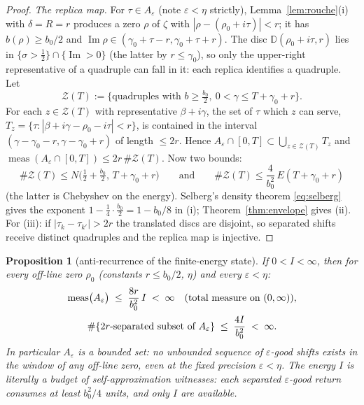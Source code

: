 \documentclass[11pt]{amsart}
\theoremstyle{plain}
\newtheorem{proposition}[theorem]{Proposition}
\theoremstyle{definition}
\theoremstyle{remark}
\newcommand{\meas}{\operatorname{meas}}
\newcommand{\Imm}{\operatorname{Im}}
\begin{document}
\begin{proof}
\emph{The replica map.} For $\tau\in A_\varepsilon$ (note $\varepsilon<\eta$ strictly), Lemma~\ref{lem:rouche}(i) with $\delta=R=r$ produces a zero $\rho$ of $\zeta$ with $|\rho-(\rho_0+i\tau)|<r$; it has $b(\rho)\ge b_0/2$ and $\Imm\rho\in(\gamma_0+\tau-r,\gamma_0+\tau+r)$. The disc $\mathbb D(\rho_0+i\tau,r)$ lies in $\{\sigma>\tfrac12\}\cap\{\Imm>0\}$ (the latter by $r\le\gamma_0$), so only the upper-right representative of a quadruple can fall in it: each replica identifies a quadruple. Let
\[
\mathcal Z(T):=\bigl\{\text{quadruples with } b\ge\tfrac{b_0}2,\ 0<\gamma\le T+\gamma_0+r\bigr\}.
\]
For each $z\in\mathcal Z(T)$ with representative $\beta+i\gamma$, the set of $\tau$ which $z$ can serve, $T_z=\{\tau:|\beta+i\gamma-\rho_0-i\tau|<r\}$, is contained in the interval $(\gamma-\gamma_0-r,\gamma-\gamma_0+r)$ of length $\le2r$. Hence $A_\varepsilon\cap[0,T]\subset\bigcup_{z\in\mathcal Z(T)}T_z$ and $\meas(A_\varepsilon\cap[0,T])\le2r\,\#\mathcal Z(T)$. Now two bounds:
\[
\#\mathcal Z(T)\le N\bigl(\tfrac12+\tfrac{b_0}2,\,T+\gamma_0+r\bigr)
\qquad\text{and}\qquad
\#\mathcal Z(T)\le\frac{4}{b_0^2}\,E(T+\gamma_0+r)
\]
(the latter is Chebyshev on the energy). Selberg's density theorem \eqref{eq:selberg} gives the exponent $1-\tfrac14\cdot\tfrac{b_0}2=1-b_0/8$ in (i); Theorem~\ref{thm:envelope} gives (ii). For (iii): if $|\tau_k-\tau_{k'}|>2r$ the translated discs are disjoint, so separated shifts receive distinct quadruples and the replica map is injective.
\end{proof}

\begin{proposition}[anti-recurrence of the finite-energy state]\label{prop:antirecurrence}
If $0<I<\infty$, then for \emph{every} off-line zero $\rho_0$ (constants $r\le b_0/2$, $\eta$) and every $\varepsilon<\eta$:
\[
\begin{gathered}
\meas\bigl(A_\varepsilon\bigr)\;\le\;\frac{8r}{b_0^2}\,I\;<\;\infty
\quad\text{\textup{(}total measure on $(0,\infty)$\textup{)}},\\[2pt]
\#\{\textup{$2r$-separated subset of }A_\varepsilon\}\;\le\;\frac{4I}{b_0^2}\;<\;\infty .
\end{gathered}
\]
In particular $A_\varepsilon$ is a \emph{bounded} set: no unbounded sequence of $\varepsilon$-good shifts exists in the window of any off-line zero, even at the fixed precision $\varepsilon<\eta$. The energy $I$ is literally a budget of self-approximation witnesses: each separated $\varepsilon$-good return consumes at least $b_0^2/4$ units, and only $I$ are available.
\end{proposition}
\end{document}
